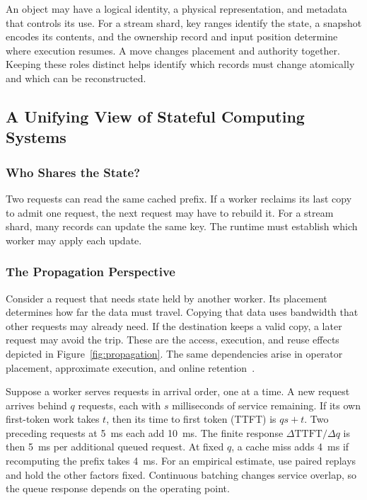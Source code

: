 \documentclass[manuscript]{acmart}
\begin{document}
An object may have a logical identity, a physical representation, and metadata that controls its use. For a stream shard, key ranges identify the state, a snapshot encodes its contents, and the ownership record and input position determine where execution resumes. A move changes placement and authority together. Keeping these roles distinct helps identify which records must change atomically and which can be reconstructed.

\subsection{A Unifying View of Stateful Computing Systems}

\subsubsection{Who Shares the State?}

Two requests can read the same cached prefix. If a worker reclaims its last copy to admit one request, the next request may have to rebuild it. For a stream shard, many records can update the same key. The runtime must establish which worker may apply each update.
\subsubsection{The Propagation Perspective}

Consider a request that needs state held by another worker. Its placement determines how far the data must travel. Copying that data uses bandwidth that other requests may already need. If the destination keeps a valid copy, a later request may avoid the trip. These are the access, execution, and reuse effects depicted in Figure~\ref{fig:propagation}. The same dependencies arise in operator placement, approximate execution, and online retention~\cite{zhang2019briskstream,zeng2024pecj,zhou2025ferret}.

Suppose a worker serves requests in arrival order, one at a time. A new request arrives behind $q$ requests, each with $s$ milliseconds of service remaining. If its own first-token work takes $t$, then its time to first token (TTFT) is $qs+t$. Two preceding requests at 5~ms each add 10~ms. The finite response $\Delta\mathrm{TTFT}/\Delta q$ is then 5~ms per additional queued request. At fixed $q$, a cache miss adds 4~ms if recomputing the prefix takes 4~ms. For an empirical estimate, use paired replays and hold the other factors fixed. Continuous batching changes service overlap, so the queue response depends on the operating point.
\end{document}
